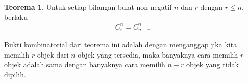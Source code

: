 \documentclass[aspectratio=169]{beamer}
\theoremstyle{definition}
\newtheorem{teorema}{Teorema}
\begin{document}
\begin{frame}
  \frametitle{\insertsection}
  \begin{teorema}
    Untuk setiap bilangan bulat non-negatif $n$ dan $r$ dengan $r \leq n$, berlaku
    \begin{align}
        C_r^n=C_{n-r}^n
    \end{align}
  \end{teorema}
  Bukti kombinatorial dari teorema ini adalah dengan menganggap jika kita memilih $r$ objek dari $n$ objek yang tersedia, maka banyaknya cara memilih $r$ objek adalah sama dengan banyaknya cara memilih $n-r$ objek yang tidak dipilih.
\end{frame}
\end{document}
